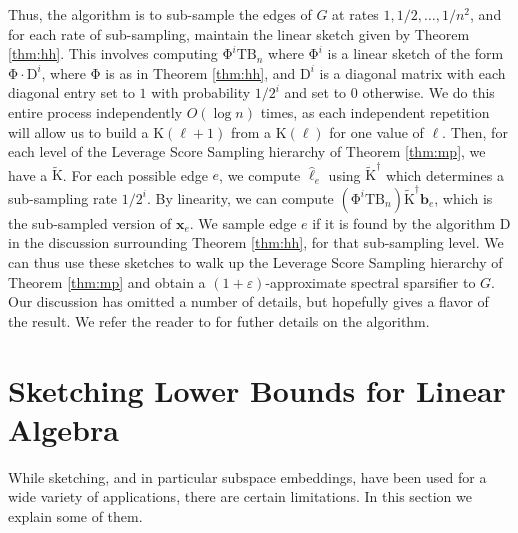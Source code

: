 \documentclass[11pt]{article}
\newcommand{\mat}[1]{{\ensuremath{\bm{\mathrm{#1}}}}}
\def\b{{\mathbf b}}
\def\matB{\mat{B}}
\def\matD{\mat{D}}
\def\matK{\mat{K}}
\def\matT{\mat{T}}
\def\x{{\mathbf x}}
\def\b{{\mathbf b}}
\newcommand{\eps}{\varepsilon}
\begin{document}
Thus, the algorithm is to sub-sample the edges of $G$ at rates $1, 1/2, \ldots, 1/n^2$, and for each rate
of sub-sampling, maintain the linear sketch given by Theorem \ref{thm:hh}. This involves computing $\mat\Phi^i \matT \matB_n$
where $\mat\Phi^i$ is a linear sketch of the form $\mat\Phi \cdot \matD^i$, where $\mat\Phi$ is as in Theorem \ref{thm:hh},
and $\matD^i$ is a diagonal matrix with each diagonal entry set to $1$ with probability $1/2^i$ and set to $0$ otherwise.
We do this entire process independently
$O(\log n)$ times, as each independent repetition will allow us to build a $\matK(\ell+1)$ from a $\matK(\ell)$ for one
value of $\ell$. 
Then, for each level of the Leverage Score Sampling hierarchy of Theorem \ref{thm:mp}, we
have a $\tilde{\matK}$. For each possible edge $e$, we compute $\hat{\ell}_e$ using $\tilde{\matK}^{\dagger}$ which determines
a sub-sampling rate $1/2^i$. By linearity, we can compute $(\mat\Phi^i \matT \matB_n) \tilde{\matK}^{\dagger} \b_e$, which is the
sub-sampled version of $\x_e$. We sample edge $e$ 
if it is found by the algorithm $\matD$ in the discussion surrounding Theorem \ref{thm:hh}, for that sub-sampling level. We 
can thus use these sketches to walk up the Leverage Score Sampling hierarchy of Theorem \ref{thm:mp} and 
obtain a $(1+\eps)$-approximate spectral sparsifier to $G$. 
Our discussion has omitted a number of details, but hopefully gives a flavor of the result. 
We refer the reader to \cite{KLMMS14} for futher details
on the algorithm. 

\section{Sketching Lower Bounds for Linear Algebra}\label{chap:lb}
While sketching, and in particular subspace embeddings, have been used for a wide variety of applications, there
are certain limitations. In this section we explain some of them.
\end{document}
